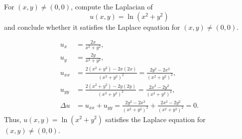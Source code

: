 \documentclass[plain]{pset}
\begin{document}
\pagebreak

\begin{problem}
For \((x, y) \neq (0, 0)\), compute the Laplacian of
\[u(x, y) = \ln\left(x^2 + y^2\right)\]
and conclude whether it satisfies the Laplace equation for \((x, y) \neq (0, 0)\).
\end{problem}
\begin{solution}
    \begin{align*}
        u_x      & = \frac{2x}{x^2 + y^2},                                                                        \\
        u_y      & = \frac{2y}{x^2 + y^2},                                                                        \\
        u_{xx}   & = \frac{2(x^2 + y^2) - 2x(2x)}{(x^2 + y^2)^2} = \frac{2y^2 - 2x^2}{(x^2 + y^2)^2},             \\
        u_{yy}   & = \frac{2(x^2 + y^2) - 2y(2y)}{(x^2 + y^2)^2} = \frac{2x^2 - 2y^2}{(x^2 + y^2)^2},             \\
        \Delta u & = u_{xx} + u_{yy} = \frac{2y^2 - 2x^2}{(x^2 + y^2)^2} + \frac{2x^2 - 2y^2}{(x^2 + y^2)^2} = 0.
    \end{align*}
    Thus, \(u(x, y) = \ln\left(x^2 + y^2\right)\) satisfies the Laplace equation for \((x, y) \neq (0, 0)\).
\end{solution}

\pagebreak
\end{document}
